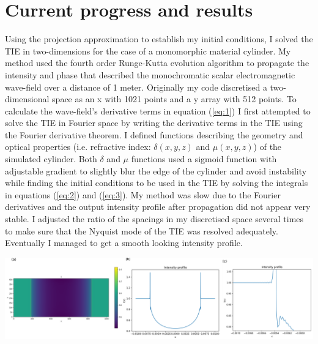 \documentclass[9pt, a4paper]{article}
\newenvironment{Figure}
    {\par\medskip\noindent\minipage{\linewidth}}
    {\endminipage\par\medskip}
\begin{document}
\section{Current progress and results}

Using the projection approximation to establish my initial conditions, I solved the TIE in two-dimensions for the case of a monomorphic material cylinder. My method used the fourth order Runge-Kutta evolution algorithm to propagate the intensity and phase that described the monochromatic scalar electromagnetic wave-field over a distance of 1 meter. Originally my code discretised a two-dimensional space as an x with 1021 points and a y array with 512 points. To calculate the wave-field's derivative terms in equation (\ref{eq:1}) I first attempted to solve the TIE in Fourier space by writing the derivative terms in the TIE using the Fourier derivative theorem. I defined functions describing the geometry and optical properties (i.e. refractive index: $\delta(x, y, z)$ and $\mu(x, y, z)$) of the simulated cylinder. Both $\delta$ and $\mu$ functions used a sigmoid function with adjustable gradient to slightly blur the edge of the cylinder and avoid instability while finding the initial conditions to be used in the TIE by solving the integrals in equations (\ref{eq:2}) and (\ref{eq:3}). My method was slow due to the Fourier derivatives and the output intensity profile after propagation did not appear very stable. I adjusted the ratio of the spacings in my discretised space several times to make sure that the Nyquist mode of the TIE was resolved adequately. Eventually I managed to get a smooth looking intensity profile.
\begin{Figure}
\centering
\includegraphics[width=\linewidth]{Fourier_intensity_profile.pdf}
\end{Figure}
\end{document}
